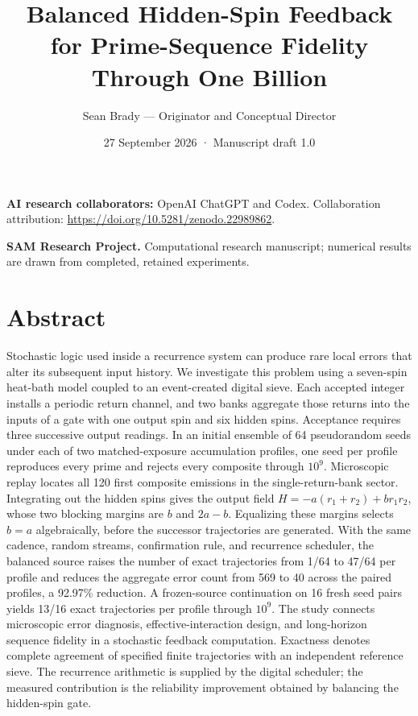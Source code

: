 \documentclass[
  11pt,
]{article}
\title{Balanced Hidden-Spin Feedback for Prime-Sequence Fidelity Through
One Billion}
\author{Sean Brady --- Originator and Conceptual Director}
\date{27 September 2026 · Manuscript draft 1.0}
\begin{document}
\maketitle

\textbf{AI research collaborators:} OpenAI ChatGPT and Codex.
Collaboration attribution:
\url{https://doi.org/10.5281/zenodo.22989862}.

\textbf{SAM Research Project.} Computational research manuscript;
numerical results are drawn from completed, retained experiments.

\section{Abstract}\label{abstract}

Stochastic logic used inside a recurrence system can produce rare local
errors that alter its subsequent input history. We investigate this
problem using a seven-spin heat-bath model coupled to an event-created
digital sieve. Each accepted integer installs a periodic return channel,
and two banks aggregate those returns into the inputs of a gate with one
output spin and six hidden spins. Acceptance requires three successive
output readings. In an initial ensemble of 64 pseudorandom seeds under
each of two matched-exposure accumulation profiles, one seed per profile
reproduces every prime and rejects every composite through \(10^9\).
Microscopic replay locates all 120 first composite emissions in the
single-return-bank sector. Integrating out the hidden spins gives the
output field \(H=-a(r_1+r_2)+br_1r_2\), whose two blocking margins are
\(b\) and \(2a-b\). Equalizing these margins selects \(b=a\)
algebraically, before the successor trajectories are generated. With the
same cadence, random streams, confirmation rule, and recurrence
scheduler, the balanced source raises the number of exact trajectories
from 1/64 to 47/64 per profile and reduces the aggregate error count
from 569 to 40 across the paired profiles, a 92.97\% reduction. A
frozen-source continuation on 16 fresh seed pairs yields 13/16 exact
trajectories per profile through \(10^9\). The study connects
microscopic error diagnosis, effective-interaction design, and
long-horizon sequence fidelity in a stochastic feedback computation.
Exactness denotes complete agreement of specified finite trajectories
with an independent reference sieve. The recurrence arithmetic is
supplied by the digital scheduler; the measured contribution is the
reliability improvement obtained by balancing the hidden-spin gate.
\end{document}
